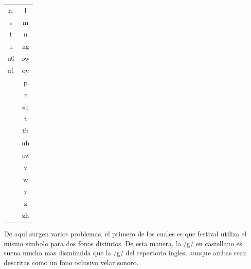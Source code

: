 \begin{table}
\begin{minipage}[t]{0.3\textwidth}
\begin{tabular}[t]{cc}
rr & l \\ 
s & m \\  
t & n \\ 
u & ng \\ 
u0 & ow \\  
u1 & oy \\ 
 & p \\ 
 & r \\ 
 & sh \\ 
 &t \\ 
 &th \\ 
 &uh \\ 
 &uw \\ 
 &v \\ 
 &w \\ 
 &y \\ 
 &z \\ 
 &zh \\ 
\bottomrule
\end{tabular}
\end{minipage}
\end{table}

De aquí surgen varios problemas, el primero de los cuales es que festival utiliza el mismo simbolo para dos fonos distintos. De esta manera, la /g/ en castellano es suena mucho mas disminuida que la /g/ del repertorio ingles, aunque ambas sean descritas como un fono oclusivo velar sonoro.

